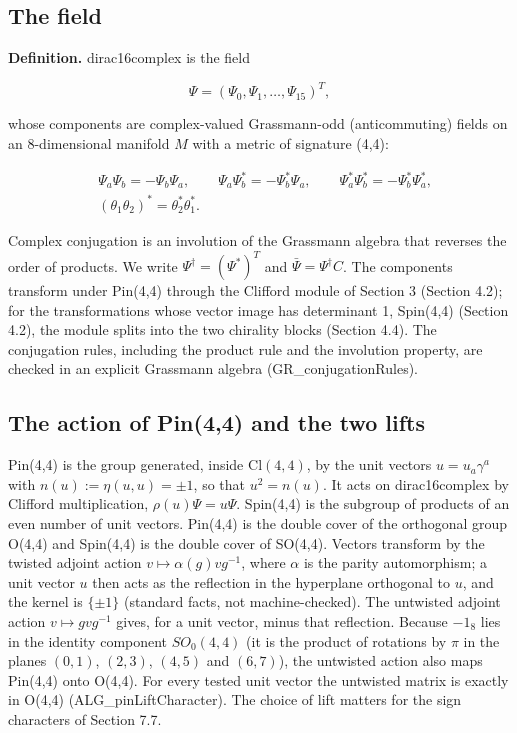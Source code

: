 \documentclass[11pt]{article}
\begin{document}
\subsection{The field}

\textbf{Definition.} dirac16complex is the field

\[
\Psi=(\Psi_0,\Psi_1,\dots,\Psi_{15})^T,
\]

whose components are complex-valued Grassmann-odd (anticommuting) fields on an 8-dimensional manifold $M$ with a metric of signature (4,4):

\[
\begin{aligned}
&\Psi_a\Psi_b=-\Psi_b\Psi_a,\qquad \Psi_a\Psi_b^\ast=-\Psi_b^\ast\Psi_a,\qquad \Psi_a^\ast\Psi_b^\ast=-\Psi_b^\ast\Psi_a^\ast,\\
&(\theta_1\theta_2)^\ast=\theta_2^\ast\theta_1^\ast .
\end{aligned}
\]

Complex conjugation is an involution of the Grassmann algebra that reverses the order of products. We write $\Psi^\dagger=(\Psi^\ast)^T$ and $\bar\Psi=\Psi^\dagger C$. The components transform under Pin(4,4) through the Clifford module of Section 3 (Section 4.2); for the transformations whose vector image has determinant 1, Spin(4,4) (Section 4.2), the module splits into the two chirality blocks (Section 4.4). The conjugation rules, including the product rule and the involution property, are checked in an explicit Grassmann algebra (GR\_conjugationRules).

\subsection{The action of Pin(4,4) and the two lifts}

Pin(4,4) is the group generated, inside $\mathrm{Cl}(4,4)$, by the unit vectors $u=u_a\gamma^a$ with $n(u):=\eta(u,u)=\pm1$, so that $u^2=n(u)$. It acts on dirac16complex by Clifford multiplication, $\rho(u)\Psi=u\Psi$. Spin(4,4) is the subgroup of products of an even number of unit vectors. Pin(4,4) is the double cover of the orthogonal group O(4,4) and Spin(4,4) is the double cover of SO(4,4). Vectors transform by the twisted adjoint action $v\mapsto\alpha(g)vg^{-1}$, where $\alpha$ is the parity automorphism; a unit vector $u$ then acts as the reflection in the hyperplane orthogonal to $u$, and the kernel is $\{\pm1\}$ (standard facts, not machine-checked). The untwisted adjoint action $v\mapsto gvg^{-1}$ gives, for a unit vector, minus that reflection. Because $-1_8$ lies in the identity component $SO_0(4,4)$ (it is the product of rotations by $\pi$ in the planes $(0,1)$, $(2,3)$, $(4,5)$ and $(6,7)$), the untwisted action also maps Pin(4,4) onto O(4,4). For every tested unit vector the untwisted matrix is exactly in O(4,4) (ALG\_pinLiftCharacter). The choice of lift matters for the sign characters of Section 7.7.
\end{document}
